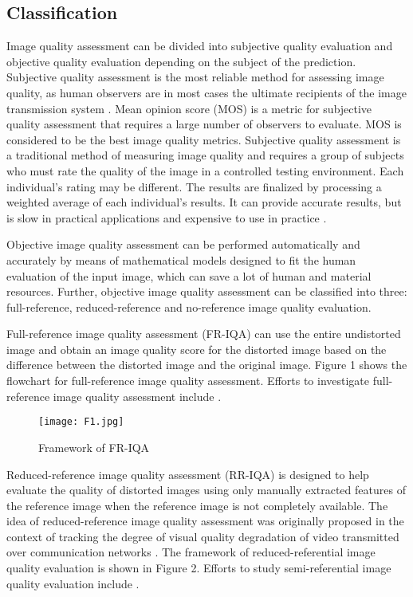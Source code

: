 \documentclass{article}
\begin{document}
\subsection{Classification}
\label{classification}
Image quality assessment can be divided into subjective quality evaluation and objective quality evaluation depending on the subject of the prediction. Subjective quality assessment is the most reliable method for assessing image quality, as human observers are in most cases the ultimate recipients of the image transmission system \cite{mohammadi2014subjective}. Mean opinion score (MOS) is a metric for subjective quality assessment that requires a large number of observers to evaluate. MOS is considered to be the best image quality metrics. Subjective quality assessment is a traditional method of measuring image quality and requires a group of subjects who must rate the quality of the image in a controlled testing environment. Each  individual's rating may be different. The results are finalized by processing a weighted average of each  individual's results. It can provide accurate results, but is slow in practical applications and expensive to use in practice \cite{wang2011applications}.

Objective image quality assessment can be performed automatically and accurately by means of mathematical models designed to fit the human evaluation of the input image, which can save a lot of human and material resources. Further, objective image quality assessment can be classified into three: full-reference, reduced-reference and no-reference image quality evaluation.

Full-reference image quality assessment (FR-IQA) can use the entire undistorted image and obtain an image quality score for the distorted image based on the difference between the distorted image and the original image. Figure 1 shows the flowchart for full-reference image quality assessment. Efforts to investigate full-reference image quality assessment include \cite{wang2004image,wang2003multiscale,sheikh2006image,larson2010most,zhang2011fsim}.



\begin{figure}[htbp]
    \centering
    \texttt{[image: F1.jpg]}
    \caption{Framework of FR-IQA}
    \label{1}
\end{figure} 


Reduced-reference image quality assessment (RR-IQA) is designed to help evaluate the quality of distorted images using only manually extracted features of the reference image when the reference image is not completely available. The idea of reduced-reference image quality assessment was originally proposed in the context of tracking the degree of visual quality degradation of video transmitted over communication networks \cite{he2014objective}. The framework of reduced-referential image quality evaluation is shown in Figure 2. Efforts to study semi-referential image quality evaluation include \cite{rehman2012reduced,wang2005reduced,li2009reduced,gu2013new,wu2016orientation}.
\end{document}
